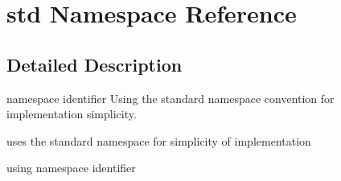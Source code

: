 \hypertarget{namespacestd}{\section{std Namespace Reference}
\label{namespacestd}
}


\subsection{Detailed Description}
namespace identifier Using the standard namespace convention for implementation simplicity.

uses the standard namespace for simplicity of implementation

using namespace identifier 